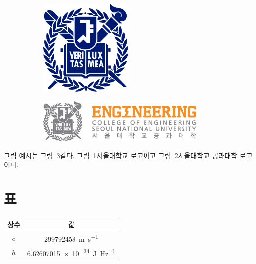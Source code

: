 \documentclass[10pt,a4paper]{report}
\begin{document}
\begin{figure}[htp]
    \renewcommand\baselinestretch{1.3}
    \centering
    \begin{subfigure}[b]{0.5\textwidth}
        \centering
        \includegraphics[width=0.5\textwidth]{logo1.pdf}
        \label{fig:snu}
    \end{subfigure}%
    \begin{subfigure}[b]{0.5\textwidth}
        \centering
        \includegraphics[width=0.9\textwidth]{logo2.pdf}
        \label{fig:eng}
    \end{subfigure}
    \label{fig:example}
\end{figure}

그림 예시는 그림~\ref{fig:example}\와 같다. 그림~\ref{fig:snu}\은 서울대학교 로고이고 그림~\ref{fig:eng}\는 서울대학교 공과대학 로고이다.


\section{표}\label{table}

\begin{table}[htp]
    \renewcommand\baselinestretch{1.3}
    \centering
    \begin{tabular}{cc}
        \toprule
        상수 & 값 \\\midrule
        $c$ & \SI{299792458}{\meter\per\second} \\
        $h$ & \SI{6.62607015e-34}{\joule\per\hertz} \\\bottomrule
    \end{tabular}
    \label{tab:example}
\end{table}
\end{document}
